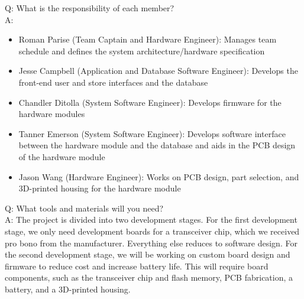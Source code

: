 \documentclass{article}
\begin{document}
Q: What is the responsibility of each member? \\
A: \\
\begin{itemize}
\item Roman Parise (Team Captain and Hardware Engineer): Manages team schedule and defines the system architecture/hardware specification
\item Jesse Campbell (Application and Database Software Engineer): Develops the front-end user and store interfaces and the database
\item Chandler Ditolla (System Software Engineer): Develops firmware for the hardware modules
\item Tanner Emerson (System Software Engineer): Develops software interface between the hardware module and the database and aids in the PCB design of the hardware module
\item Jason Wang (Hardware Engineer): Works on PCB design, part selection, and 3D-printed housing for the hardware module
\end{itemize}

Q: What tools and materials will you need? \\
A: The project is divided into two development stages. For the first development stage, we only need development boards for a transceiver chip, which we received pro bono from the manufacturer. Everything else reduces to software design. For the second development stage, we will be working on custom board design and firmware to reduce cost and increase battery life. This will require board components, such as the transceiver chip and flash memory, PCB fabrication, a battery, and a 3D-printed housing.
\end{document}
